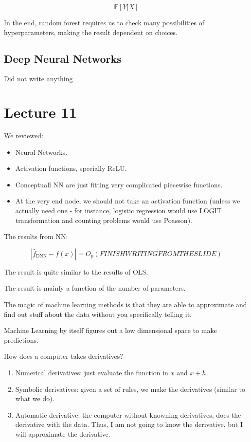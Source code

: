 \documentclass{article}
\begin{document}
$$
\mathbb{E}[Y | X]
$$

In the end, random forest requires us to check many possibilities of hyperparameters, making the result dependent on choices.

\subsection{Deep Neural Networks}

Did not write anything

\section{Lecture 11}

We reviewed:
\begin{itemize}
    \item Neural Networks.
    \item Activation functions, specially ReLU.
    \item Conceptuall NN are just fitting very complicated piecewise functions.
    \item At the very end node, we should not take an activation function (unless we actually need one - for instance, logistic regression would use LOGIT transformation and counting problems would use Poasson).
\end{itemize}

The results from NN:

$$
\left| \hat{f}_{\text{DNN}} - f(x) \right| = O_p (FINISH WRITING FROM THE SLIDE)
$$

The result is quite similar to the results of OLS.

The result is mainly a function of the number of parameters.

The magic of machine learning methods is that they are able to approximate and find out stuff about the data without you specifically telling it.

Machine Learning by itself figures out a low dimensional space to make predictions.

How does a computer takes derivatives?
\begin{enumerate}
    \item Numerical derivatives: just evaluate the function in $x$ and $x + h$.
    \item Symbolic derivatives: given a set of rules, we make the derivatives (similar to what we do).
    \item Automatic derivative: the computer without knowning derivatives, does the derivative with the data. Thus, I am not going to know the derivative, but I will approximate the derivative.
\end{enumerate}
\end{document}
